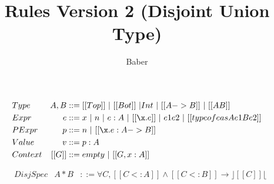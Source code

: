 \documentclass[a4paper]{article}
\title{Rules Version 2 (Disjoint Union Type)}
\author{Baber}
\begin{document}
\maketitle

\begin{align*}
&Type &A, B&::= [[Top]] ~ | ~[[Bot]]~| Int ~|~ [[A->B]]~ |~ [[A \/ B]]\\
&Expr &e &::= x ~|~ n ~|~ e:A ~|~[[\x.e]] ~ | ~ e1e2 ~|~ [[typeof e as A e1 B e2]]\\
&PExpr & p &::= n ~|~ [[\x.e : A->B]] \\
&Value &v &::= p : A \\
&Context & [[G]] &::= empty~ |~ [[G , x : A]]
\end{align*}

\begin{align*}
&DisjSpec & A * B & ::= \forall C, [[C <: A]] \wedge [[C <: B]] \rightarrow  \rfloor [[C]] \lfloor
\end{align*}

\bigskip

\ottdefnsBottomLike

\ottdefnsDisjointness

\ottdefnsSubtyping

\ottdefnsTyping

\ottdefnsReduction
\end{document}
